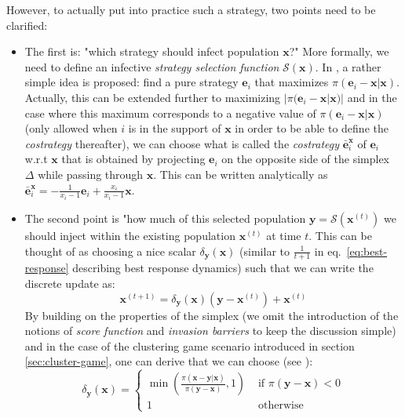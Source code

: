 \documentclass[11pt,a4paper]{article}
\begin{document}
However, to actually put into practice such a strategy, two points need to be clarified:
\begin{itemize}
    \item The first is: "which strategy should infect population $\mathbf{x}$?" More formally, we need to define an infective \textit{strategy selection function} $\mathcal{S}(\mathbf{x})$. In \cite{inimdyn}, a rather simple idea is proposed: find a pure strategy $\mathbf{e}_i$ that maximizes $\pi(\mathbf{e}_i-\mathbf{x}|\mathbf{x})$. Actually, this can be extended further to maximizing $|\pi(\mathbf{e}_i-\mathbf{x}|\mathbf{x})|$ and in the case where this maximum corresponds to a negative value of $\pi(\mathbf{e}_i-\mathbf{x}|\mathbf{x})$ (only allowed when $i$ is in the support of $\mathbf{x}$ in order to be able to define the \textit{costrategy} thereafter), we can choose what is called the \textit{costrategy} $\bar{\mathbf{e}}_i^\mathbf{x}$ of $\mathbf{e}_i$ w.r.t $\mathbf{x}$ that is obtained by projecting $\mathbf{e}_i$ on the opposite side of the simplex $\Delta$ while passing through $\mathbf{x}$. This can be written analytically as $\bar{\mathbf{e}}_i^\mathbf{x}=-\frac{1}{x_i-1}\mathbf{e}_i+\frac{x_i}{x_i-1}\mathbf{x}$.
    \item The second point is "how much of this selected population $\mathbf{y}=\mathcal{S}(\mathbf{x}^{(t)})$ we should inject within the existing population $\mathbf{x}^{(t)}$ at time $t$. This can be thought of as choosing a nice scalar $\delta_\mathbf{y}(\mathbf{x})$ (similar to $\frac{1}{t+1}$ in eq.~\ref{eq:best-response} describing best response dynamics) such that we can write the discrete update as:
    \begin{equation}
        \label{eq:inimdyn}
        \mathbf{x}^{(t+1)} = \delta_\mathbf{y}(\mathbf{x}) (\mathbf{y} - \mathbf{x}^{(t)}) + \mathbf{x}^{(t)}
    \end{equation}
    By building on the properties of the simplex (we omit the introduction of the notions of \textit{score function} and \textit{invasion barriers} to keep the discussion simple) and in the case of the clustering game scenario introduced in section \ref{sec:cluster-game}, one can derive that we can choose (see \cite{bulo-thesis}):
    \begin{equation}
        \delta_\mathbf{y}(\mathbf{x}) = \begin{cases}
            \min\left(\frac{\pi(\mathbf{x}-\mathbf{y}|\mathbf{x})}{\pi(\mathbf{y}-\mathbf{x})}, 1\right) & \text{ if $\pi(\mathbf{y}-\mathbf{x}) < 0$} \\
            1 & \text{ otherwise}
        \end{cases}
    \end{equation}
\end{itemize}
\end{document}
